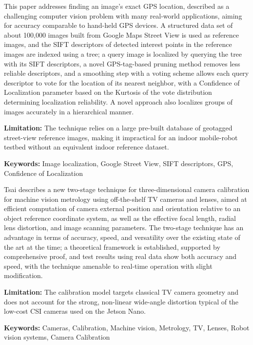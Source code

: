 {
	This paper \cite{Zamir:2010} addresses finding an image's exact GPS location, described as a challenging computer vision problem with many real-world applications, aiming for accuracy comparable to hand-held GPS devices. A structured data set of about 100,000 images built from Google Maps Street View is used as reference images, and the SIFT descriptors of detected interest points in the reference images are indexed using a tree; a query image is localized by querying the tree with its SIFT descriptors, a novel GPS-tag-based pruning method removes less reliable descriptors, and a smoothing step with a voting scheme allows each query descriptor to vote for the location of its nearest neighbor, with a Confidence of Localization parameter based on the Kurtosis of the vote distribution determining localization reliability. A novel approach also localizes groups of images accurately in a hierarchical manner.
	
	\bigskip
	\textbf{Limitation:} The technique relies on a large pre-built database of geotagged street-view reference images, making it impractical for an indoor mobile-robot testbed without an equivalent indoor reference dataset.
	
	\scriptsize{\textbf{Keywords:} Image localization, Google Street View, SIFT descriptors, GPS, Confidence of Localization}
}



{
	Tsai \cite{Tsai:1987} describes a new two-stage technique for three-dimensional camera calibration for machine vision metrology using off-the-shelf TV cameras and lenses, aimed at efficient computation of camera external position and orientation relative to an object reference coordinate system, as well as the effective focal length, radial lens distortion, and image scanning parameters. The two-stage technique has an advantage in terms of accuracy, speed, and versatility over the existing state of the art at the time; a theoretical framework is established, supported by comprehensive proof, and test results using real data show both accuracy and speed, with the technique amenable to real-time operation with slight modification.
	
	\bigskip
	\textbf{Limitation:} The calibration model targets classical TV camera geometry and does not account for the strong, non-linear wide-angle distortion typical of the low-cost CSI cameras used on the Jetson Nano.
	
	\scriptsize{\textbf{Keywords:} Cameras, Calibration, Machine vision, Metrology, TV, Lenses, Robot vision systems, Camera Calibration}
}

